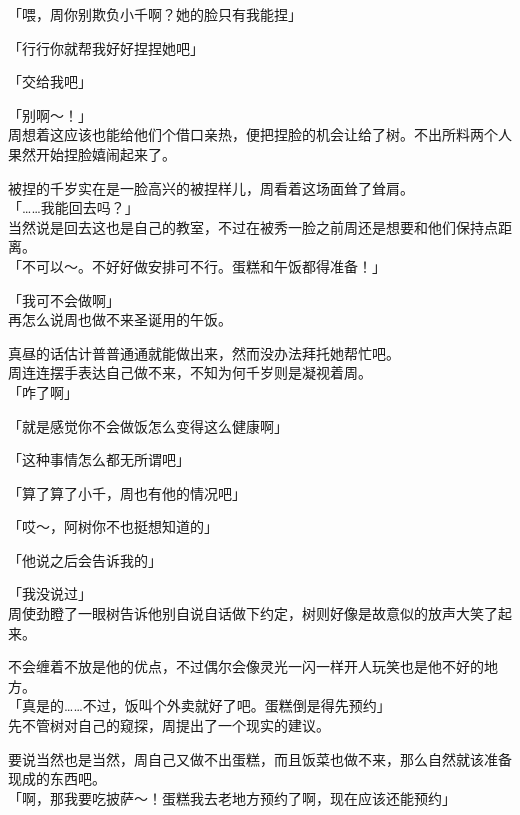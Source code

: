 「喂，周你别欺负小千啊？她的脸只有我能捏」

「行行你就帮我好好捏捏她吧」

「交给我吧」

「别啊～！」\\

周想着这应该也能给他们个借口亲热，便把捏脸的机会让给了树。不出所料两个人果然开始捏脸嬉闹起来了。

被捏的千岁实在是一脸高兴的被捏样儿，周看着这场面耸了耸肩。\\

「……我能回去吗？」\\

当然说是回去这也是自己的教室，不过在被秀一脸之前周还是想要和他们保持点距离。\\

「不可以～。不好好做安排可不行。蛋糕和午饭都得准备！」

「我可不会做啊」\\

再怎么说周也做不来圣诞用的午饭。

真昼的话估计普普通通就能做出来，然而没办法拜托她帮忙吧。\\

周连连摆手表达自己做不来，不知为何千岁则是凝视着周。\\

「咋了啊」

「就是感觉你不会做饭怎么变得这么健康啊」

「这种事情怎么都无所谓吧」

「算了算了小千，周也有他的情况吧」

「哎～，阿树你不也挺想知道的」

「他说之后会告诉我的」

「我没说过」\\

周使劲瞪了一眼树告诉他别自说自话做下约定，树则好像是故意似的放声大笑了起来。

不会缠着不放是他的优点，不过偶尔会像灵光一闪一样开人玩笑也是他不好的地方。\\

「真是的……不过，饭叫个外卖就好了吧。蛋糕倒是得先预约」\\

先不管树对自己的窥探，周提出了一个现实的建议。

要说当然也是当然，周自己又做不出蛋糕，而且饭菜也做不来，那么自然就该准备现成的东西吧。\\

「啊，那我要吃披萨～！蛋糕我去老地方预约了啊，现在应该还能预约」

